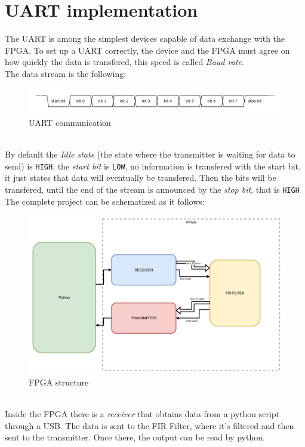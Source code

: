 \documentclass[11pt,a4paper,twocolumn]{IEEEtran}
\begin{document}
	\section{UART implementation}
	The UART is among the simplest devices capable of data exchange with the FPGA.
	To set up a UART correctly, the device and the FPGA must agree on how quickly the data is transfered, this speed is called \emph{Baud rate}.\\
	The data stream is the following:
	\begin{figure}[h]
		\centering
		\includegraphics[width=1\linewidth]{img/baud}
		\caption{UART communication}
	\end{figure}\\
	By default the \emph{Idle state} (the state where the transmitter is waiting for data to send) is \texttt{HIGH}, the \emph{start bit} is \texttt{LOW}, no information is transfered with the start bit, it just states that data will eventually be transfered. Then the bits will be transfered, until the end of the stream is announced by the \emph{stop bit}, that is \texttt{HIGH}\medskip\\
	The complete project can be schematized as it follows:
	\begin{figure}[h]
		\centering
		\includegraphics[width=1\linewidth]{img/projectcomplete}
		\caption{FPGA structure}
	\end{figure}\\
	Inside the FPGA there is a \emph{receiver} that obtains data from a python script through a USB. The data is sent to the FIR Filter, where it's filtered and then sent to the transmitter. Once there, the output can be read by python.\\
\end{document}
